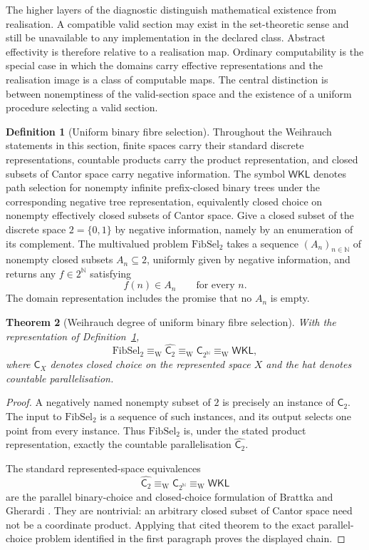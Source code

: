 \documentclass[11pt]{article}
\theoremstyle{plain}
\newtheorem{theorem}{Theorem}[section]
\theoremstyle{definition}
\newtheorem{definition}[theorem]{Definition}
\theoremstyle{remark}
\newcommand{\N}{\mathbb{N}}
\begin{document}
The higher layers of the diagnostic distinguish mathematical existence from
realisation. A compatible valid section may exist in the set-theoretic sense and
still be unavailable to any implementation in the declared class. Abstract
effectivity is therefore relative to a realisation map. Ordinary computability is
the special case in which the domains carry effective representations and the
realisation image is a class of computable maps. The central distinction is
between nonemptiness of the valid-section space and the existence of a uniform
procedure selecting a valid section.

\begin{definition}[Uniform binary fibre selection]
\label{def:fibsel-weihrauch}
Throughout the Weihrauch statements in this section, finite spaces carry their
standard discrete representations, countable products carry the product
representation, and closed subsets of Cantor space carry negative information.
The symbol $\mathsf{WKL}$ denotes path selection for nonempty infinite
prefix-closed binary trees under the corresponding negative tree representation,
equivalently closed choice on nonempty effectively closed subsets of Cantor
space. Give a closed subset of the discrete space $2=\{0,1\}$ by negative
information, namely by an enumeration of its complement. The multivalued
problem $\mathrm{FibSel}_2$ takes a sequence $(A_n)_{n\in\N}$ of nonempty closed
subsets $A_n\subseteq2$, uniformly given by negative information, and returns
any $f\in2^\N$ satisfying
\[
f(n)\in A_n\qquad\text{for every }n.
\]
The domain representation includes the promise that no $A_n$ is empty.
\end{definition}

\begin{theorem}[Weihrauch degree of uniform binary fibre selection]
\label{thm:fibsel-weihrauch}
With the representation of Definition~\ref{def:fibsel-weihrauch},
\[
\mathrm{FibSel}_2
\equiv_{\mathrm W}
\widehat{\mathsf C_2}
\equiv_{\mathrm W}
\mathsf C_{2^\N}
\equiv_{\mathrm W}
\mathsf{WKL},
\]
where $\mathsf C_X$ denotes closed choice on the represented space $X$ and the
hat denotes countable parallelisation.
\end{theorem}

\begin{proof}
A negatively named nonempty subset of $2$ is precisely an instance of
$\mathsf C_2$. The input to $\mathrm{FibSel}_2$ is a sequence of such instances,
and its output selects one point from every instance. Thus
$\mathrm{FibSel}_2$ is, under the stated product representation, exactly the
countable parallelisation $\widehat{\mathsf C_2}$.

The standard represented-space equivalences
\[
\widehat{\mathsf C_2}
\equiv_{\mathrm W}\mathsf C_{2^\N}
\equiv_{\mathrm W}\mathsf{WKL}
\]
are the parallel binary-choice and closed-choice formulation of
Brattka and Gherardi \cite{brattkagherardi}. They are nontrivial:
an arbitrary closed subset of Cantor space need not be a coordinate product.
Applying that cited theorem to the exact parallel-choice problem identified in
the first paragraph proves the displayed chain.
\end{proof}
\end{document}
